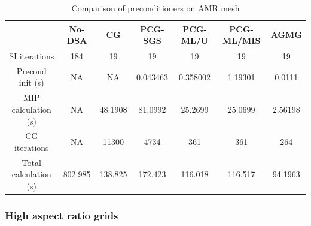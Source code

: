 \begin{table}[H]
  \caption{Comparison of preconditioners on AMR mesh}
  \begin{center}
    \begin{tabular}{|c|c|c|c|c|c|c|}
      \hline
       & No-DSA & CG & PCG-SGS & PCG-ML/U & PCG-ML/MIS & AGMG \\
      \hline
   SI iterations & 184     & 19      & 19       & 19      & 19       & 19 \\
Precond init (s) & NA      & NA      & 0.043463 & 0.358002 & 1.19301 & 0.0111\\
MIP calculation (s) & NA   & 48.1908 & 81.0992  & 25.2699 & 25.0699  & 
      2.56198\\
   CG iterations & NA      & 11300   & 4734     & 361     & 361      & 264 \\
     Total calculation (s) & 802.985 & 138.825 & 172.423  & 116.018 & 116.517  &
      94.1963\\
      \hline
    \end{tabular}
    \label{table_amr}
  \end{center}
\end{table}

\subsubsection{High aspect ratio grids}

